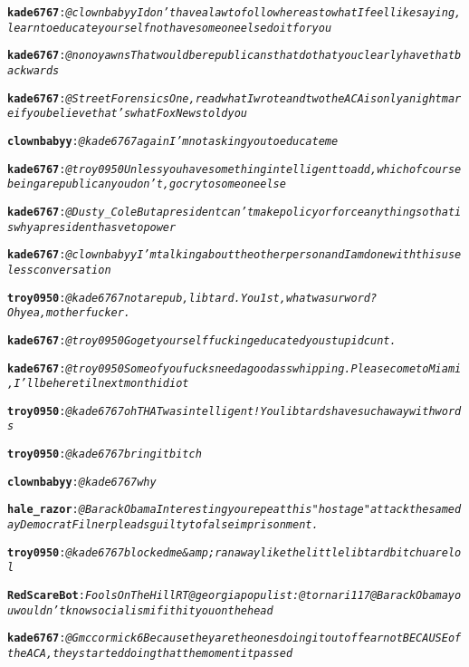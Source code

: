 \begin{alltt}
\textbf{kade6767}: \emph{@clownbabyy I don't have a law to follow here as to what I feel like saying, learn to educate yourself not have someone else do it for you}

\textbf{kade6767}: \emph{@nonoyawns That would be republicans that do that you clearly have that backwards}

\textbf{kade6767}: \emph{@StreetForensics One, read what I wrote and two the ACA is only a nightmare if you believe that's what Fox News told you}

\textbf{clownbabyy}: \emph{@kade6767 again I'm not asking you to educate me}

\textbf{kade6767}: \emph{@troy0950 Unless you have something intelligent to add, which of course being a republican you don't, go cry to someone else}

\textbf{kade6767}: \emph{@Dusty_Cole But a president can't make policy or force anything so that is why a president has veto power}

\textbf{kade6767}: \emph{@clownbabyy I'm talking about the other person and I am done with this useless conversation}

\textbf{troy0950}: \emph{@kade6767 not a repub, libtard. You 1st, what was ur word? Oh yea, motherfucker.}

\textbf{kade6767}: \emph{@troy0950 Go get yourself fucking educated you stupid cunt.}

\textbf{kade6767}: \emph{@troy0950 Some of you fucks need a good ass whipping. Please come to Miami, I'll be here til next month idiot}

\textbf{troy0950}: \emph{@kade6767 oh THAT was intelligent! You libtards have such a way with words}

\textbf{troy0950}: \emph{@kade6767 bring it bitch}

\textbf{clownbabyy}: \emph{@kade6767 why}

\textbf{hale_razor}: \emph{@BarackObama Interesting you repeat this "hostage" attack the same day Democrat Filner pleads guilty to false imprisonment.}

\textbf{troy0950}: \emph{@kade6767 blocked me &amp; ran away like the little libtard bitch u are lol}

\textbf{RedScareBot}: \emph{Fools On The Hill RT @georgiapopulist: @tornari117 @BarackObama you wouldn't know socialism if it hit you on the head}

\textbf{kade6767}: \emph{@Gmccormick6 Because they are the ones doing it out of fear not BECAUSE of the ACA, they started doing that the moment it passed}


\end{alltt}
